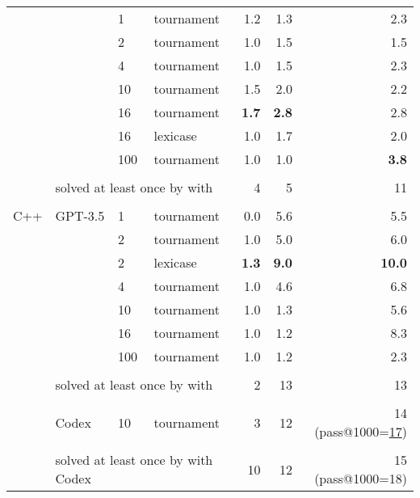 \begin{table}[b]
\begin{adjustbox}{max width=.92\textwidth}
\begin{DIFnomarkup}
\begin{tabular}{llllrrr}
% 
        & \llama{} & 1   &         tournament &     1.2 &      1.3 &       2.3 \\
        &        & 2   &         tournament &     1.0 &      1.5 &       1.5 \\
        &        & 4   &         tournament &     1.0 &      1.5 &       2.3 \\
        &        & 10  &         tournament &     1.5 &      2.0 &       2.2 \\
        &        & 16  &         tournament &     \textbf{1.7} &      \textbf{2.8} &       2.8 \\
        &        & 16  &           lexicase &     1.0 &      1.7 &       2.0 \\
        &        & 100 &         tournament &     1.0 &      1.0 &       \textbf{3.8} \\[1pt]
\cline{3-7}\\[-8pt]
    &  \multicolumn{3}{l}{solved at least once by \method{} with \llama{}} &   4 &        5 &       11 \\
\midrule\\[-8pt]
 C++ & GPT-3.5 & 1   &         tournament &     0.0 &      5.6 &       5.5 \\
       &        & 2   &         tournament &     1.0 &      5.0 &       6.0 \\
       &        & 2   &           lexicase &     \textbf{1.3} &     \textbf{ 9.0} &      \textbf{10.0} \\
       &        & 4   &         tournament &     1.0 &      4.6 &       6.8 \\
       &        & 10  &         tournament &     1.0 &      1.3 &       5.6 \\
       &        & 16  &         tournament &     1.0 &      1.2 &       8.3 \\
       &        & 100 &         tournament &     1.0 &      1.2 &       2.3 \\[1pt]
\cline{3-7}\\[-8pt]
       & \multicolumn{3}{l}{solved at least once by \method{} with \gpt{}}   & 2 &       13 &       13 \\[1pt]
% 
\cline{2-7}\\[-8pt]
   & Codex  & 10 & tournament &     3 &       12 &   14 (pass@1000=\underline{17})\\[1pt]
\cline{3-7}\\[-8pt]
       & \multicolumn{3}{l}{solved at least once by \method{} with Codex}   & 10 &       12 &        15 (pass@1000=18) \\[1pt]

\end{tabular}
\end{DIFnomarkup}
\end{adjustbox}
\end{table}
